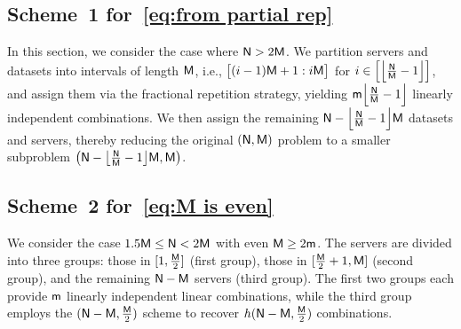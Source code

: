 \documentclass[conference,letterpaper]{IEEEtran}
\begin{document}
\subsection{\texorpdfstring{Scheme~1 for~\eqref{eq:from partial rep}}{Scheme 1 for Eq. (X)}}
\label{sub:partial rep}
In this section, we consider the case where ${\sf N} > 2{\sf M}$. We partition servers and datasets into intervals of length \({\sf M}\), i.e., \(\bigl[(i-1){\sf M} + 1 : i{\sf M}\bigr]\) for \(i \in \Bigl[\Bigl\lfloor \frac{{\sf N}}{{\sf M}} - 1 \Bigr\rfloor\Bigr]\), and assign them via the fractional repetition strategy, yielding \({\sf m} \Bigl\lfloor \frac{{\sf N}}{{\sf M}} - 1 \Bigr\rfloor\) linearly independent combinations. We then assign the remaining \({\sf N} - \Bigl\lfloor \frac{{\sf N}}{{\sf M}} - 1 \Bigr\rfloor {\sf M}\) datasets and servers, thereby reducing the original \(({\sf N}, {\sf M})\) problem to a smaller subproblem \(\bigl({\sf N} - \bigl\lfloor \tfrac{{\sf N}}{{\sf M}} - 1 \bigr\rfloor {\sf M}, {\sf M}\bigr)\).

 
\subsection{\texorpdfstring{Scheme~2 for~\eqref{eq:M is even}}{Scheme 2 for Eq. (X)}}

\label{sub:M is even}

We consider the case \(1.5 {\sf M} \leq {\sf N} < 2 {\sf M}\) with even \({\sf M} \geq 2{\sf m}\). The servers are divided into three groups: those in \([1, \tfrac{{\sf M}}{2}]\) (first group), those in \([\tfrac{{\sf M}}{2}+1, {\sf M}]\) (second group), and the remaining \({\sf N} - {\sf M}\) servers (third group). The first two groups each provide \({\sf m}\) linearly independent linear combinations, while the third group employs the \(({\sf N} - {\sf M}, \tfrac{{\sf M}}{2})\) scheme to recover \(h({\sf N} - {\sf M}, \tfrac{{\sf M}}{2})\) combinations.
\end{document}
